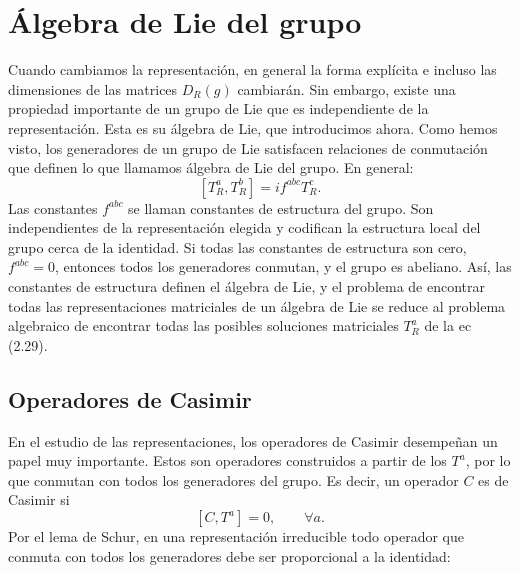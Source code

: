 \documentclass[a4paper,11pt]{book} %
\begin{document}
\section{Álgebra de Lie del grupo}
\noindent
Cuando cambiamos la representación, en general la forma explícita e incluso las dimensiones de las matrices $D_R(g)$ cambiarán. Sin embargo, existe una propiedad importante de un grupo de Lie que es independiente de la
representación. Esta es su álgebra de Lie, que introducimos ahora.
\medskip\newline
Como hemos visto, los generadores de un grupo de Lie satisfacen relaciones de conmutación que
definen lo que llamamos álgebra de Lie del grupo. En general:
\begin{equation}
    \left[
        T^a_R,
        T^b_R
    \right]
    =
    i f^{abc} T^c_R.
\end{equation}
\noindent
Las constantes \(f^{abc}\) se llaman constantes de estructura del grupo. Son
independientes de la representación elegida y codifican la estructura local del
grupo cerca de la identidad.
\medskip\newline
Si todas las constantes de estructura son cero, $f^{abc}=0$, entonces todos los generadores conmutan, y el grupo es abeliano.
\medskip\newline
Así, las constantes de estructura definen el álgebra de Lie, y el problema
de encontrar todas las representaciones matriciales de un álgebra de Lie se
reduce al problema algebraico de encontrar todas las posibles soluciones
matriciales $T_R^a$ de la ec (2.29).
\subsection{Operadores de Casimir}
\noindent
En el estudio de las representaciones, los operadores de Casimir desempeñan
un papel muy importante. Estos son operadores construidos a partir de los $T^a$, por lo
que conmutan con todos los generadores del grupo. Es decir, un operador
\(C\) es de Casimir si
\begin{equation}
    \left[
        C,
        T^a
    \right]
    =
    0,
    \qquad
    \forall a.
\end{equation}
\noindent
Por el lema de Schur, en una representación irreducible todo operador que
conmuta con todos los generadores debe ser proporcional a la identidad:
\end{document}

